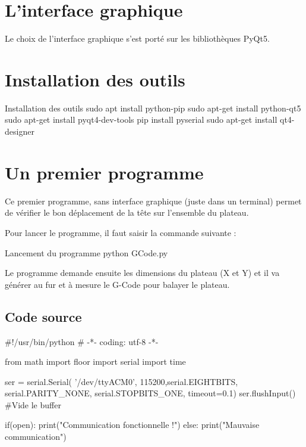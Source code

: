 {\section{L'interface graphique}

Le choix de l'interface graphique s'est porté sur les bibliothèques PyQt5.\\


\section{Installation des outils}


\begin{Bash}{Installation des outils}
sudo apt install python-pip
sudo apt-get install python-qt5
sudo apt-get install pyqt4-dev-tools 
pip install pyserial
sudo apt-get install qt4-designer
\end{Bash}


    
\section{Un premier programme}

Ce premier programme, sans interface graphique (juste dans un terminal) permet de vérifier le bon déplacement de la tête sur l'ensemble du plateau.



Pour lancer le programme, il faut saisir la commande suivante : 
\begin{Bash}{Lancement du programme}
python GCode.py
\end{Bash}

Le programme demande ensuite les dimensions du plateau (X et Y) et il va générer au fur et à mesure le G-Code pour balayer le plateau.

\subsection{Code source}

\begin{Python}
#!/usr/bin/python
# -*- coding: utf-8 -*-

from math import floor
import serial
import time

ser = serial.Serial( '/dev/ttyACM0', 115200,serial.EIGHTBITS, serial.PARITY_NONE, serial.STOPBITS_ONE, timeout=0.1)
ser.flushInput()  #Vide le buffer

if(open):
    print("Communication fonctionnelle !")
else:
    print("Mauvaise communication")


\end{Python}}
